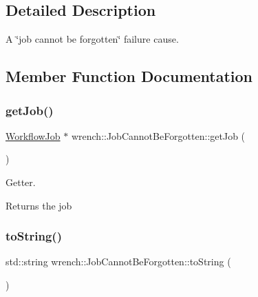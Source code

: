 \subsection{Detailed Description}
A \char`\"{}job cannot be forgotten\char`\"{} failure cause. 

\subsection{Member Function Documentation}
\mbox{\label{classwrench_1_1_job_cannot_be_forgotten_ae21aa5adc48ff0998d9fefc7f2c4c9f9}} 
\subsubsection{\texorpdfstring{get\+Job()}{getJob()}}
{\footnotesize\ttfamily \hyperlink{classwrench_1_1_workflow_job}{Workflow\+Job} $\ast$ wrench\+::\+Job\+Cannot\+Be\+Forgotten\+::get\+Job (\begin{DoxyParamCaption}{ }\end{DoxyParamCaption})}



Getter. 

\begin{DoxyReturn}{Returns}
the job 
\end{DoxyReturn}
\mbox{\label{classwrench_1_1_job_cannot_be_forgotten_abbfbece144c738c9948bf8f01d6bbd53}} 
\subsubsection{\texorpdfstring{to\+String()}{toString()}}
{\footnotesize\ttfamily std\+::string wrench\+::\+Job\+Cannot\+Be\+Forgotten\+::to\+String (\begin{DoxyParamCaption}{ }\end{DoxyParamCaption})\hspace{0.3cm}{\ttfamily [virtual]}}




